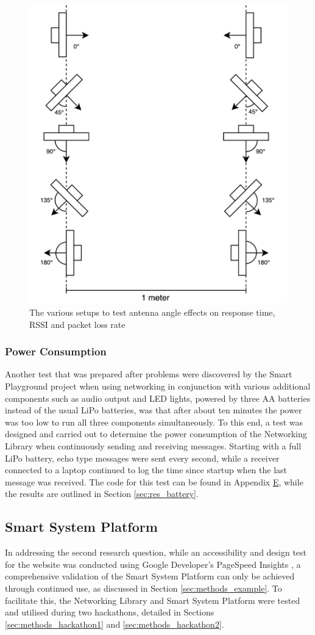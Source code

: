 \begin{figure}[H]
    \centering
    \includegraphics[width=0.5\linewidth]{overleaf/images/angletest.drawio.png}
    \vspace{\ftspace}
    \caption{The various setups to test antenna angle effects on response time, RSSI and packet loss rate}
    \label{fig:angle}
\end{figure}

\subsubsection{\label{sec:methods_test_batter}Power Consumption}
Another test that was prepared after problems were discovered by the Smart Playground project when using networking in conjunction with various additional components such as audio output and LED lights, powered by three AA batteries instead of the usual LiPo batteries, was that after about ten minutes the power was too low to run all three components simultaneously. To this end, a test was designed and carried out to determine the power consumption of the Networking Library when continuously sending and receiving messages. Starting with a full LiPo battery, echo type messages were sent every second, while a receiver connected to a laptop continued to log the time since startup when the last message was received. The code for this test can be found in Appendix \hyperref[chap:apx_e]{E}, while the results are outlined in Section \ref{sec:res_battery}.

\subsection{\label{sec:methods_tools}Smart System Platform}
In addressing the second research question, while an accessibility and design test for the website was conducted using Google Developer's PageSpeed Insights \citep{noauthor_about_nodate}, a comprehensive validation of the Smart System Platform can only be achieved through continued use, as discussed in Section \ref{sec:methods_example}. To facilitate this, the Networking Library and Smart System Platform were tested and utilised during two hackathons, detailed in Sections \ref{sec:methods_hackathon1} and \ref{sec:methods_hackathon2}.

